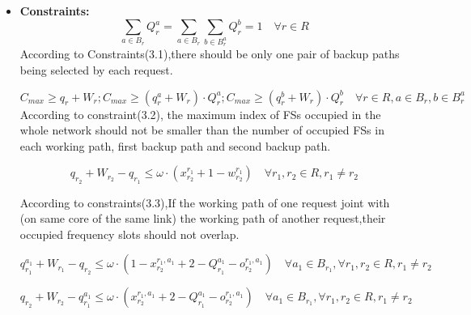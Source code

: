 \documentclass[a4paper,11pt]{report}
\begin{document}
\begin{itemize}
    \item \textbf{Constraints:}
    \begin{equation}
        \sum\limits_{a\in B^{}_r} Q^{a}_r = \sum\limits_{a\in B^{}_r} \sum\limits_{b\in B^{a}_r} Q^{b}_r = 1 \quad
        \forall{r\in R}
        \label{ilp-st}
    \end{equation}
    According to Constraints(3.1),there should be only one pair of backup paths being selected by each request.\par

    \begin{equation}
         C^{}_{max} \ge q^{}_{r}+W^{}_r;
         C^{}_{max}\ge (q^{a}_{r}+W^{}_r) \cdot Q^{a}_r;
         C^{}_{max}\ge (q^{b}_{r}+W^{}_r) \cdot Q^{b}_r \quad\forall{r\in R,a\in B^{}_r,b\in B^{a}_r} \label{ilp-st}
    \end{equation}
     According to constraint(3.2), the maximum index of FSs occupied in the whole network should not be smaller than the number of  occupied FSs in each working path, first backup path and second backup path.
     

     \begin{equation}
        q^{}_{r_2}+W^{}_{r_2}-q^{}_{r_1} \leq \omega\cdot(x^{r_1}_{r_2}+1-w^{r_1}_{r_2}) \quad\forall{r_1,r_2\in R,r_1\neq r_2} \label{ilp-st}
    \end{equation}

    According to constraints(3.3),If the working path of one request joint with (on same core of the same link) the working path of another request,their occupied frequency slots should not overlap.
    
    \begin{equation}
        q^{a_1}_{r_1}+W^{}_{r_1}-q^{}_{r_2} \leq \omega\cdot(1-x^{r_1,a_1}_{r_2}+2-Q^{a_1}_{r_1}-o^{r_1,a_1}_{r_2})
        \quad\forall{a_1\in B^{}_{r_1}},\forall{r_1,r_2\in R,r_1\neq r_2} \label{ilp-st}
    \end{equation}

    \begin{equation}
        q^{}_{r_2}+W^{}_{r_2}-q^{a_1}_{r_1} \leq \omega\cdot(x^{r_1,a_1}_{r_2}+2-Q^{a_1}_{r_1}-o^{r_1,a_1}_{r_2})
        \quad\forall{a_1\in B^{}_{r_1}},\forall{r_1,r_2\in R,r_1\neq r_2} \label{ilp-st}
    \end{equation}


\end{itemize}
\end{document}
